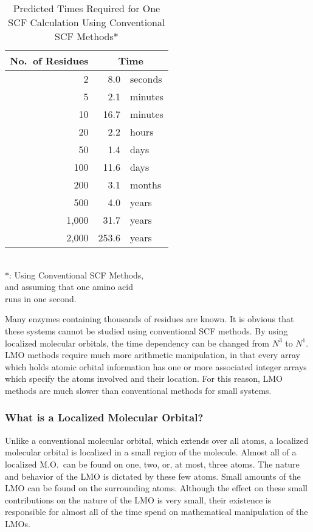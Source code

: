 \begin{table}
\begin{center}
\caption[Times for One SCF Calculation]{\label{t-amino}Predicted Times Required 
for One SCF Calculation Using Conventional SCF Methods*}
\begin{tabular}{rrl}\\ \hline
No.\ of Residues  &   \multicolumn{2}{c}{Time} \\ \hline
2        &   8.0 & seconds \\
5        &   2.1 & minutes \\
10       &  16.7 & minutes \\
20       &   2.2 & hours   \\
50       &  1.4 & days   \\
100      & 11.6 & days  \\
200      & 3.1 & months \\
500      & 4.0 & years  \\
1,000    & 31.7 & years \\
2,000    & 253.6 & years \\
\hline
\end{tabular} \\
$*$: Using Conventional SCF Methods, \\ and assuming that one
amino acid \\ runs in one second.
\end{center}
\end{table}

Many enzymes containing thousands of residues are known.  It is obvious that
these systems cannot be studied using conventional SCF methods.  By using
localized molecular orbitals, the time dependency can be changed from $N^3$ to
$N^1$.  LMO methods require much more arithmetic manipulation, in that every
array which holds atomic orbital information has one or more associated integer
arrays which specify the atoms involved and their location. For this reason,
LMO methods are much slower than conventional methods for small systems.  

\subsubsection{What is a Localized Molecular Orbital?}
Unlike a conventional molecular orbital, which extends over all atoms, a
localized molecular orbital is   localized in a small region of the molecule. 
Almost all of a localized M.O.\ can be found on one, two, or, at most, three
atoms. The nature and behavior of the LMO is dictated by these few atoms. Small
amounts of the LMO can be found on the surrounding atoms.  Although the effect
on these small contributions on the nature of the LMO is very small, their
existence is responsible for almost all of the time spend on mathematical
manipulation of the LMOs.

